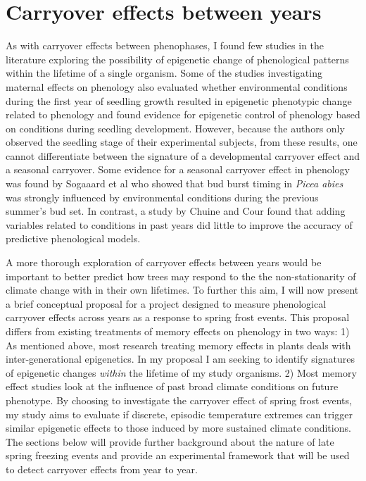 \documentclass{article}\usepackage[]{graphicx}\usepackage[]{color}
\begin{document}
\section{Carryover effects between years}
\par As with carryover effects between phenophases, I found few studies in the literature exploring the possibility of epigenetic change of phenological patterns within the lifetime of a single organism.
Some of the studies investigating maternal effects on phenology also evaluated whether environmental conditions during the first year of seedling growth resulted in epigenetic phenotypic change related to phenology \citep{Gomory2014} and found evidence for epigenetic control of phenology based on conditions during seedling development. However, because the authors only observed the seedling stage of their experimental subjects, from these results, one cannot differentiate between the signature of a developmental carryover effect and a seasonal carryover. Some evidence for a seasonal carryover effect in phenology was found by Sogaaard et al \citeyear{Sogaard2008} who showed that  bud burst timing in \textit{Picea abies} was strongly influenced by environmental conditions during the previous summer's bud set. In contrast, a study by Chuine and Cour \citeyear{Chuine1999} found that adding variables related to conditions in past years did little to improve the accuracy of predictive phenological models.
\par A more thorough exploration of carryover effects between years would be important to better predict how trees may respond to the the non-stationarity of climate change with in their own lifetimes. To further this aim, I will now present a brief conceptual proposal for a project designed to measure phenological carryover effects across years as a response to spring frost events. This proposal differs from existing treatments of memory effects on phenology in two ways:
1) As mentioned above, most research treating memory effects in plants deals with inter-generational epigenetics. In my proposal I am seeking to identify signatures of epigenetic changes \textit{within} the lifetime of my study organisms.
2) Most memory effect studies look at the influence of past broad climate conditions on future phenotype. By choosing to investigate the carryover effect of spring frost events, my study aims to evaluate if discrete, episodic temperature extremes can trigger similar epigenetic effects to those induced by more sustained climate conditions. The sections below will provide further background about the nature of late spring freezing events and provide an experimental framework that will be used to detect carryover effects from year to year.
\end{document}
